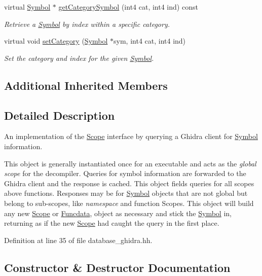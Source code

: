 \begin{DoxyCompactItemize}
virtual \mbox{\hyperlink{class_symbol}{Symbol}} $\ast$ \mbox{\hyperlink{class_scope_ghidra_aa3b3e331ed319e74af4a5927f7e70660}{get\+Category\+Symbol}} (int4 cat, int4 ind) const
\begin{DoxyCompactList}\small\item\em Retrieve a \mbox{\hyperlink{class_symbol}{Symbol}} by index within a specific {\itshape category}. \end{DoxyCompactList}\item 
virtual void \mbox{\hyperlink{class_scope_ghidra_aafecf1b8615812bdbd8efeca910594a2}{set\+Category}} (\mbox{\hyperlink{class_symbol}{Symbol}} $\ast$sym, int4 cat, int4 ind)
\begin{DoxyCompactList}\small\item\em Set the {\itshape category} and index for the given \mbox{\hyperlink{class_symbol}{Symbol}}. \end{DoxyCompactList}\end{DoxyCompactItemize}
\subsection*{Additional Inherited Members}


\subsection{Detailed Description}
An implementation of the \mbox{\hyperlink{class_scope}{Scope}} interface by querying a Ghidra client for \mbox{\hyperlink{class_symbol}{Symbol}} information. 

This object is generally instantiated once for an executable and acts as the {\itshape global} {\itshape scope} for the decompiler. Queries for symbol information are forwarded to the Ghidra client and the response is cached. This object fields queries for all scopes above functions. Responses may be for \mbox{\hyperlink{class_symbol}{Symbol}} objects that are not global but belong to sub-\/scopes, like {\itshape namespace} and function Scopes. This object will build any new \mbox{\hyperlink{class_scope}{Scope}} or \mbox{\hyperlink{class_funcdata}{Funcdata}}, object as necessary and stick the \mbox{\hyperlink{class_symbol}{Symbol}} in, returning as if the new \mbox{\hyperlink{class_scope}{Scope}} had caught the query in the first place. 

Definition at line 35 of file database\+\_\+ghidra.\+hh.



\subsection{Constructor \& Destructor Documentation}
\mbox{\label{class_scope_ghidra_a715046c5b708da35b3547780a3226713}} 
